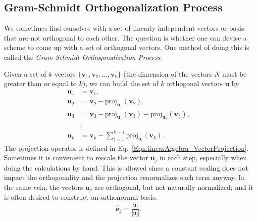 \subsection{Gram-Schmidt Orthogonalization Process} \label{Sec:linearAlgebra_CoordinateSystems_GramSchmidt}

We sometimes find ourselves with a set of linearly independent vectors or basis that are not orthogonal to each other. The question is whether one can devise a scheme to come up with a set of orthogonal vectors. One method of doing this is called the \emph{Gram-Schmidt Orthogonalization Process}. 

Given a set of $k$ vectors $\{ \mathbf{v}_1, \mathbf{v}_2, \ldots , \mathbf{v}_k \}$ (the dimension of the vectors $N$ must be greater than or equal to $k$), we can build the set of $k$ orthogonal vectors $\mathbf{u}$ by
\begin{align}
  \mathbf{u}_1 &= \mathbf{v}_1, \nonumber \\
  \mathbf{u}_2 &= \mathbf{v}_2 - \text{proj}_{ \mathbf{u}_1 }( \mathbf{v}_2 ) , \nonumber \\
  \mathbf{u}_3 &= \mathbf{v}_3 - \text{proj}_{ \mathbf{u}_1 }( \mathbf{v}_3 ) - \text{proj}_{ \mathbf{u}_2 }( \mathbf{v}_3 ) , \nonumber \\
  &\vdots \nonumber \\
  \mathbf{u}_k &= \mathbf{v}_k - \sum_{i=1}^{k-1} \text{proj}_{ \mathbf{u}_i }( \mathbf{v}_k ) .   
\end{align}
The projection operator is defined in Eq.~\eqref{Eqn:linearAlgebra_VectorProjection}. Sometimes it is convenient to rescale the vector $\mathbf{u}_j$ in each step, especially when doing the calculations by hand. This is allowed since a constant scaling does not impact the orthogonality and the projection renormalizes each term anyway. In the same vein, the vectors $\mathbf{u}_j$ are orthogonal, but not naturally normalized; and it is often desired to construct an orthonormal basis:
\begin{align}
  \hat{\mathbf{e}}_j = \frac{ \mathbf{u}_j }{ | \mathbf{u}_j | } .
\end{align}

